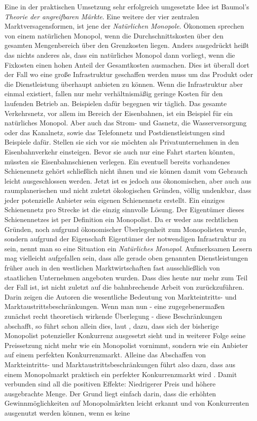 Eine in der praktischen Umsetzung sehr erfolgreich umgesetzte Idee ist Baumol's \textit{Theorie der angreifbaren Märkte}. Eine weitere der vier zentralen Marktversagensformen, ist jene der \textit{Natürlichen Monopole}. Ökonomen sprechen von einem natürlichen Monopol, wenn die Durchschnittskosten über den gesamten Mengenbereich über den Grenzkosten liegen. Anders ausgedrückt heißt das nichts anderes als, dass ein natürliches Monopol dann vorliegt, wenn die Fixkosten einen hohen Anteil der Gesamtkosten ausmachen. Dies ist überall dort der Fall wo eine große Infrastruktur geschaffen werden muss um das Produkt oder die Dienstleistung überhaupt anbieten zu können. Wenn die Infrastruktur aber einmal existiert, fallen nur mehr verhältnismäßig geringe Kosten für den laufenden Betrieb an. Beispielen dafür begegnen wir täglich. Das gesamte Verkehrsnetz, vor allem im Bereich der Eisenbahnen, ist ein Beispiel für ein natürliches Monopol. Aber auch das Strom- und Gasnetz, die Wasserversorgung oder das Kanalnetz, sowie das Telefonnetz und Postdienstleistungen sind Beispiele dafür. Stellen sie sich vor sie möchten als Privatunternehmen in den Eisenbahnverkehr einsteigen. Bevor sie auch nur eine Fahrt starten könnten, müssten sie Eisenbahnschienen verlegen. Ein eventuell bereits vorhandenes Schienennetz gehört schließlich nicht ihnen und sie können damit vom Gebrauch leicht ausgeschlossen werden. Jetzt ist es jedoch aus ökonomischen, aber auch aus raumplanerischen und nicht zuletzt ökologischen Gründen, völlig undenkbar, dass jeder potenzielle Anbieter sein eigenen Schienennetz erstellt. Ein einziges Schienennetz pro Strecke ist die einzig sinnvolle Lösung. Der Eigentümer dieses Schienennetzes ist per Definition ein Monopolist. Da er weder aus rechtlichen Gründen, noch aufgrund ökonomischer Überlegenheit zum Monopolisten wurde, sondern aufgrund der Eigenschaft Eigentümer der notwendigen Infrastruktur zu sein, nennt man so eine Situation ein \textit{Natürliches Monopol}. Aufmerksamen Lesern mag vielleicht aufgefallen sein, dass alle gerade oben genannten Dienstleistungen früher auch in den westlichen Marktwirtschaften fast ausschließlich von staatlichen Unternehmen angeboten wurden. Dass dies heute nur mehr zum Teil der Fall ist, ist nicht zuletzt auf die bahnbrechende Arbeit von \textcite{Baumol1982, Baumol1982b} zurückzuführen. Darin zeigen die Autoren die wesentliche Bedeutung von Markteintritts- und Marktaustrittsbeschränkungen.  Wenn man nun - eine zugegebenermaßen zunächst recht theoretisch wirkende Überlegung - diese Beschränkungen abschafft, so führt schon allein dies, laut \textcite{Baumol1982}, dazu, dass sich der bisherige Monopolist potenzieller Konkurrenz ausgesetzt sieht und in weiterer Folge seine Preissetzung nicht mehr wie ein Monopolist vornimmt, sondern wie ein Anbieter auf einem perfekten Konkurrenzmarkt. Alleine das Abschaffen von Markteintritts- und Marktaustrittsbeschränkungen führt also dazu, dass aus einem Monopolmarkt praktisch ein perfekter Konkurrenzmarkt wird \parencite[S. 2]{Baumol1982b}. Damit verbunden sind all die positiven Effekte: Niedrigerer Preis und höhere ausgebrachte Menge. Der Grund liegt einfach darin, dass die erhöhten Gewinnmöglichkeiten auf Monopolmärkten leicht erkannt und von Konkurrenten ausgenutzt werden können, wenn es keine 